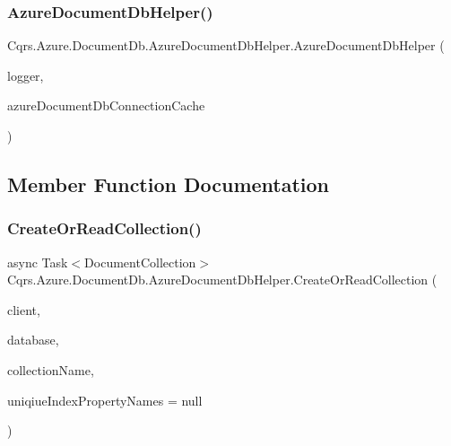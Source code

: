 \subsubsection{\texorpdfstring{Azure\+Document\+Db\+Helper()}{AzureDocumentDbHelper()}}
{\footnotesize\ttfamily Cqrs.\+Azure.\+Document\+Db.\+Azure\+Document\+Db\+Helper.\+Azure\+Document\+Db\+Helper (\begin{DoxyParamCaption}\item[{I\+Logger}]{logger,  }\item[{\hyperlink{interfaceCqrs_1_1Azure_1_1DocumentDb_1_1IAzureDocumentDbConnectionCache}{I\+Azure\+Document\+Db\+Connection\+Cache}}]{azure\+Document\+Db\+Connection\+Cache }\end{DoxyParamCaption})}



\subsection{Member Function Documentation}
\mbox{\label{classCqrs_1_1Azure_1_1DocumentDb_1_1AzureDocumentDbHelper_a5dd4b71b321017034c3d5c651017a068_a5dd4b71b321017034c3d5c651017a068}} 
\subsubsection{\texorpdfstring{Create\+Or\+Read\+Collection()}{CreateOrReadCollection()}}
{\footnotesize\ttfamily async Task$<$Document\+Collection$>$ Cqrs.\+Azure.\+Document\+Db.\+Azure\+Document\+Db\+Helper.\+Create\+Or\+Read\+Collection (\begin{DoxyParamCaption}\item[{Document\+Client}]{client,  }\item[{Database}]{database,  }\item[{string}]{collection\+Name,  }\item[{string \mbox{[}$\,$\mbox{]}}]{uniqiue\+Index\+Property\+Names = {\ttfamily null} }\end{DoxyParamCaption})}



